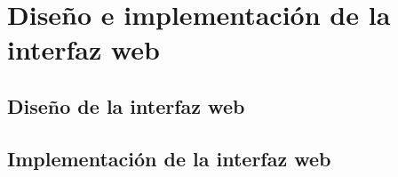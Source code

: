 \section{Diseño e implementación de la interfaz web}

\subsection{Diseño de la interfaz web}


\subsection{Implementación de la interfaz web}





















